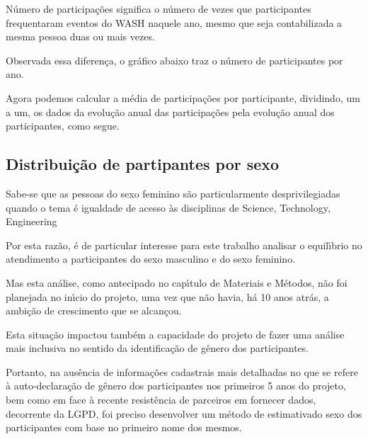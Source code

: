 \documentclass[
12pt,		%
openright,	%
twoside,  %
a4paper,			%
chapter=TITLE,		%
english,			%
french,				%
spanish,			%
brazil				%
]{USPSC-classe/USPSC}
\begin{document}
N\'umero de participa\c{c}\~oes significa o n\'umero de vezes que participantes frequentaram eventos do WASH naquele ano, mesmo que seja contabilizada a mesma pessoa duas ou mais vezes.




Observada essa diferen\c{c}a, o gr\'afico abaixo traz o n\'umero de participantes por ano.




Agora podemos calcular a m\'edia de participa\c{c}\~oes por participante, dividindo, um a um, os dados da evolu\c{c}\~ao anual das participa\c{c}\~oes pela evolu\c{c}\~ao anual dos participantes, como segue.




\subsection[Distribui\c{c}\~ao de partipantes por sexo]{Distribui\c{c}\~ao de partipantes por sexo}\label{Distribui\c{c}\~ao de partipantes por sexo}
Sabe-se que as pessoas do sexo feminino s\~ao particularmente desprivilegiadas quando o tema \'e igualdade de acesso \`as disciplinas de Science, Technology, Engineering 




Por esta raz\~ao, \'e de particular interesse para este trabalho analisar o equil\'{\i}brio no atendimento a participantes do sexo masculino e do sexo feminino.




Mas esta an\'alise, como antecipado no cap\'{\i}tulo de Materiais e M\'etodos, n\~ao foi planejada no in\'{\i}cio do projeto, uma vez que n\~ao havia, h\'a 10 anos atr\'as, a ambi\c{c}\~ao de crescimento que se alcan\c{c}ou.




Esta situa\c{c}\~ao impactou tamb\'em a capacidade do projeto de fazer uma an\'alise mais inclusiva no sentido da identifica\c{c}\~ao de g\^enero dos participantes.




Portanto, na aus\^encia de informa\c{c}\~oes cadastrais mais detalhadas no que se refere \`a auto-declara\c{c}\~ao de g\^enero dos participantes nos primeiros 5 anos do projeto, bem como em face \`a recente resist\^encia de parceiros em fornecer dados, decorrente da LGPD, foi preciso desenvolver um m\'etodo de \textquotedbl estimativa\textquotedbl  do sexo dos participantes com base no primeiro nome dos mesmos.
\end{document}
